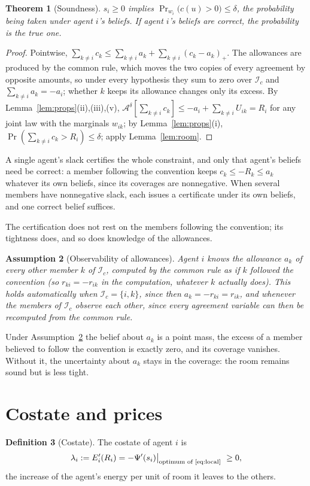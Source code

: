 \documentclass[11pt]{article}
\newtheorem{theorem}{Theorem}[section]
\newtheorem{assumption}[theorem]{Assumption}
\theoremstyle{definition}
\newtheorem{definition}[theorem]{Definition}
\theoremstyle{remark}
\newcommand{\A}{\mathcal{A}}
\newcommand{\I}{\mathcal{I}}
\renewcommand{\Pr}{\operatorname{Pr}}
\begin{document}
\begin{theorem}[Soundness]\label{thm:sound}
$s_i\ge0$ implies $\Pr_{w_i}\big(c(u)>0\big)\le\delta$, the probability being taken under agent $i$'s beliefs. If agent $i$'s beliefs are correct, the probability is the true one.
\end{theorem}
\begin{proof}
Pointwise, $\sum_{k\ne i}c_k\le\sum_{k\ne i}a_k+\sum_{k\ne i}(c_k-a_k)_+$. The allowances are produced by the common rule, which moves the two copies of every agreement by opposite amounts, so under every hypothesis they sum to zero over $\I_c$ and $\sum_{k\ne i}a_k=-a_i$; whether $k$ keeps its allowance changes only its excess. By Lemma~\ref{lem:props}(ii),(iii),(v), $\A^\delta[\sum_{k\ne i}c_k]\le-a_i+\sum_{k\ne i}U_{ik}=R_i$ for any joint law with the marginals $w_{ik}$; by Lemma~\ref{lem:props}(i), $\Pr(\sum_{k\ne i}c_k>R_i)\le\delta$; apply Lemma~\ref{lem:room}.
\end{proof}

A single agent's slack certifies the whole constraint, and only that agent's beliefs need be correct: a member following the convention keeps $c_k\le-R_k\le a_k$ whatever its own beliefs, since its coverages are nonnegative. When several members have nonnegative slack, each issues a certificate under its own beliefs, and one correct belief suffices.

The certification does not rest on the members following the convention; its tightness does, and so does knowledge of the allowances.

\begin{assumption}[Observability of allowances]\label{ass:allow}
Agent $i$ knows the allowance $a_k$ of every other member $k$ of $\I_c$, computed by the common rule as if $k$ followed the convention (so $r_{ki}=-r_{ik}$ in the computation, whatever $k$ actually does). This holds automatically when $\I_c=\{i,k\}$, since then $a_k=-r_{ki}=r_{ik}$, and whenever the members of $\I_c$ observe each other, since every agreement variable can then be recomputed from the common rule.
\end{assumption}

Under Assumption~\ref{ass:allow} the belief about $a_k$ is a point mass, the excess of a member believed to follow the convention is exactly zero, and its coverage vanishes. Without it, the uncertainty about $a_k$ stays in the coverage: the room remains sound but is less tight.

\section{Costate and prices}
\begin{definition}[Costate]
The costate of agent $i$ is
\[
\lambda_i:=E_i'(R_i)=-\Psi'(s_i)\big|_{\text{optimum of \eqref{eq:local}}}\ \ge0,
\]
the increase of the agent's energy per unit of room it leaves to the others.
\end{definition}
\end{document}
